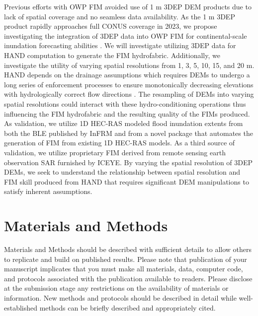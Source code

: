 \documentclass[water,article,submit,pdftex,moreauthors]{dependencies/Definitions/mdpi}
\begin{document}
Previous efforts with \ac{OWP} \ac{FIM} avoided use of 1 \ac{m} \ac{3DEP} \ac{DEM} products due to lack of spatial coverage and no seamless data availability.
As the 1 \ac{m} \ac{3DEP} product rapidly approaches full \ac{CONUS} coverage in 2023, we propose investigating the integration of \ac{3DEP} data into \ac{OWP} \ac{FIM} for continental-scale inundation forecasting abilities \cite{usgs2022status,usgs2022partnerships}.
We will investigate utilizing \ac{3DEP} data for \ac{HAND} computation to generate the \ac{FIM} hydrofabric.
Additionally, we investigate the utility of varying spatial resolutions from 1, 3, 5, 10, 15, and 20 \ac{m}.
\ac{HAND} depends on the drainage assumptions which requires \acp{DEM} to undergo a long series of enforcement processes to ensure monotonically decreasing elevations with hydrologically correct flow directions \cite{garousi2019terrain,nobre2011height,nobre2016hand,aristizabal2022extending}.
The resampling of \acp{DEM} into varying spatial resolutions could interact with these \ac{hydro-conditioning} operations thus influencing the \ac{FIM} hydrofabric and the resulting quality of the \acp{FIM} produced.
As validation, we utilize \ac{1D} \ac{HEC-RAS} modeled flood inundation extents from both the \ac{BLE} published by \ac{InFRM} and from a novel package that automates the generation of \ac{FIM} from existing \ac{1D} \ac{HEC-RAS} models.
As a third source of validation, we utilize proprietary \ac{FIM} derived from remote sensing earth observation \ac{SAR} furnished by ICEYE.
By varying the spatial resolution of \ac{3DEP} \acp{DEM}, we seek to understand the relationship between spatial resolution and \ac{FIM} skill produced from \ac{HAND} that requires significant \ac{DEM} manipulations to satisfy inherent assumptions. 

\section{Materials and Methods}
\label{sec:material_and_matheds}

Materials and Methods should be described with sufficient details to allow others to replicate and build on published results. Please note that publication of your manuscript implicates that you must make all materials, data, computer code, and protocols associated with the publication available to readers. Please disclose at the submission stage any restrictions on the availability of materials or information. New methods and protocols should be described in detail while well-established methods can be briefly described and appropriately cited.
\end{document}
